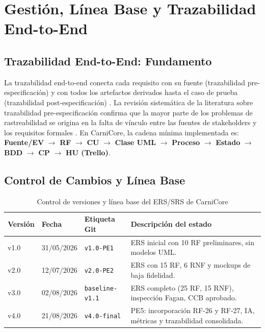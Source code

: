 \documentclass[11pt,a4paper]{article}
\begin{document}
\section{Gestión, Línea Base y Trazabilidad End-to-End}
\label{sec:trazabilidad}

\subsection{Trazabilidad End-to-End: Fundamento}

La trazabilidad end-to-end conecta cada requisito con su fuente (trazabilidad pre-especificación) y con todos los artefactos derivados hasta el caso de prueba (trazabilidad post-especificación) \cite{gotel1994}. La revisión sistemática de la literatura sobre trazabilidad pre-especificación confirma que la mayor parte de los problemas de rastreabilidad se origina en la falta de vínculo entre las fuentes de stakeholders y los requisitos formales \cite{mucha2024}. En CarniCore, la cadena mínima implementada es: \textbf{Fuente/EV} $\rightarrow$ \textbf{RF} $\rightarrow$ \textbf{CU} $\rightarrow$ \textbf{Clase UML} $\rightarrow$ \textbf{Proceso} $\rightarrow$ \textbf{Estado} $\rightarrow$ \textbf{BDD} $\rightarrow$ \textbf{CP} $\rightarrow$ \textbf{HU (Trello)}.

\subsection{Control de Cambios y Línea Base}

\begin{table}[H]
\centering
\begin{tabular}{|p{1.2cm}|p{2.2cm}|p{2.2cm}|p{7.2cm}|}
\hline
\textbf{Versión} & \textbf{Fecha} & \textbf{Etiqueta Git} & \textbf{Descripción del estado} \\
\hline
v1.0 & 31/05/2026 & \texttt{v1.0-PE1} & ERS inicial con 10 RF preliminares, sin modelos UML. \\
v2.0 & 12/07/2026 & \texttt{v2.0-PE2} & ERS con 15 RF, 6 RNF y mockups de baja fidelidad. \\
v3.0 & 02/08/2026 & \texttt{baseline-v1.1} & ERS completo (25 RF, 15 RNF), inspección Fagan, CCB aprobado. \\
v4.0 & 21/08/2026 & \texttt{v4.0-final} & PE5: incorporación RF-26 y RF-27, IA, métricas y trazabilidad consolidada. \\
\hline
\end{tabular}
\caption{Control de versiones y línea base del ERS/SRS de CarniCore}
\label{tab:linea_base}
\end{table}
\end{document}
